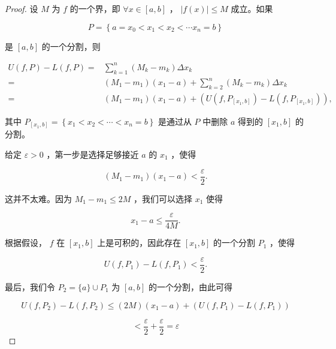 \begin{proof}
设 \(M\) 为 \(f\) 的一个界，即 \(\forall x \in  \left\lbrack  {a,b}\right\rbrack\) ， \(\left| {f\left( x\right) }\right|  \leq  M\) 成立。如果

\[
P = \left\{  {a = {x}_{0} < {x}_{1} < {x}_{2} < \cdots {x}_{n} = b}\right\}
\]

是 \(\left\lbrack  {a,b}\right\rbrack\) 的一个分割，则

\begin{align*}
U\left( {f,P}\right)  - L\left( {f,P}\right)  = &\mathop{\sum }\limits_{{k = 1}}^{n}\left( {{M}_{k} - {m}_{k}}\right) \Delta {x}_{k}\\
= & \left( {{M}_{1} - {m}_{1}}\right) \left( {{x}_{1} - a}\right)  + \mathop{\sum }\limits_{{k = 2}}^{n}\left( {{M}_{k} - {m}_{k}}\right) \Delta {x}_{k}\\
= & \left( {{M}_{1} - {m}_{1}}\right) \left( {{x}_{1} - a}\right)  + \left( {U\left( {f,{P}_{\left\lbrack  {x}_{1},b\right\rbrack  }}\right)  - L\left( {f,{P}_{\left\lbrack  {x}_{1},b\right\rbrack  }}\right) }\right) ,
\end{align*}


其中 \({P}_{\left\lbrack  {x}_{1},b\right\rbrack  } = \left\{  {{x}_{1} < {x}_{2} < \cdots  < {x}_{n} = b}\right\}\) 是通过从 \(P\) 中删除 \(a\) 得到的 \(\left\lbrack  {{x}_{1},b}\right\rbrack\) 的分割。

给定 \(\varepsilon  > 0\) ，第一步是选择足够接近 \(a\) 的 \({x}_{1}\) ，使得

\[
\left( {{M}_{1} - {m}_{1}}\right) \left( {{x}_{1} - a}\right)  < \frac{\varepsilon }{2}.
\]

这并不太难。因为 \({M}_{1} - {m}_{1} \leq  {2M}\) ，我们可以选择 \({x}_{1}\) 使得

\[
{x}_{1} - a \leq  \frac{\varepsilon }{4M}.
\]

根据假设， \(f\) 在 \(\left\lbrack  {{x}_{1},b}\right\rbrack\) 上是可积的，因此存在 \(\left\lbrack  {{x}_{1},b}\right\rbrack\) 的一个分割 \({P}_{1}\) ，使得

\[
U\left( {f,{P}_{1}}\right)  - L\left( {f,{P}_{1}}\right)  < \frac{\varepsilon }{2}.
\]

最后，我们令 \({P}_{2} = \{ a\}  \cup  {P}_{1}\) 为 \(\left\lbrack  {a,b}\right\rbrack\) 的一个分割，由此可得

\[
U\left( {f,{P}_{2}}\right)  - L\left( {f,{P}_{2}}\right)  \leq  \left( {2M}\right) \left( {{x}_{1} - a}\right)  + \left( {U\left( {f,{P}_{1}}\right)  - L\left( {f,{P}_{1}}\right) }\right)
\]

\[
< \frac{\varepsilon }{2} + \frac{\varepsilon }{2} = \varepsilon
\]
\end{proof}

